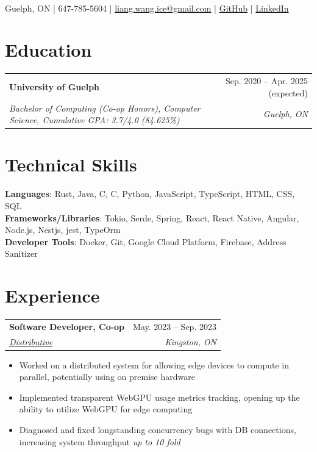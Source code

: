 \documentclass[letterpaper, 10pt]{article}
\makeatletter
\newcommand{\resumeSubheading}[4]{
    \begin{tabular*}{\textwidth}[t]{l@{\extracolsep{\fill}}r}
        \textbf{#1}       & #2                 \\
        \textit{\small#3} & \textit{\small#4} \\
    \end{tabular*}\vspace{-0.7em}
}
\newenvironment{ResumeItem}{
    \vspace{-0.5em}
    \begin{itemize}
        \setlength\itemsep{-0.3em}
        }{
    \end{itemize}\vspace{-0.3em}}
\newcommand{\cxx}{C\nolinebreak\hspace{-.05em}\raisebox{0.2ex}{\bf +}\nolinebreak\hspace{-.05em}\raisebox{.2ex}{\bf +}}
\makeatother
\begin{document}
    \begin{center}
        \textbf{\HUGE\color{Pink}{Liang Wang}} \\ \vspace{1.5em}
        \small Guelph, ON |
        647-785-5604 |
        \href{mailto:liang.wang.ice@gmail.com}{{liang.wang.ice@gmail.com}}  |
        \href{https://github.com/Internal-Compiler-Error}{{GitHub}} |
        \href{https://www.linkedin.com/in/liang-wang-225607174/}{{LinkedIn}} \\
    \end{center}

    \section{Education}
    \resumeSubheading{University of Guelph}{Sep. 2020 -- Apr. 2025 (expected)}{Bachelor of Computing (Co-op Honors), Computer Science, Cumulative GPA: 3.7/4.0 (84.625\%)}{Guelph, ON}


    \section{Technical Skills}
    \vspace{0.1em}
    \begin{itemize}[leftmargin=0em, label={}]
        \small{\item{
            \textbf{Languages}{: Rust, Java, \cxx, C, Python, JavaScript, TypeScript, HTML, CSS, SQL} \\
            \textbf{Frameworks/Libraries}{: Tokio, Serde, Spring, React, React Native, Angular, Node.js, Nestjs, jest, TypeOrm} \\
            \textbf{Developer Tools}{: Docker, Git, Google Cloud Platform, Firebase, Address Sanitizer} \\
        }}
    \end{itemize}


    \section{Experience}

    \resumeSubheading
    {Software Developer, Co-op}{May. 2023 -- Sep. 2023}
    {\href{https://kingsds.network/}{Distributive}}{Kingston, ON}
    \begin{ResumeItem}
        \item{Worked on a distributed system for allowing edge devices to compute in parallel, potentially using on premise hardware}
        \item{Implemented transparent WebGPU usage metrics tracking, opening up the ability to utilize WebGPU for edge computing}
        \item{Diagnosed and fixed longstanding concurrency bugs with DB connections, increasing system throughput \emph{up to 10 fold}}
    \end{ResumeItem}
\end{document}
